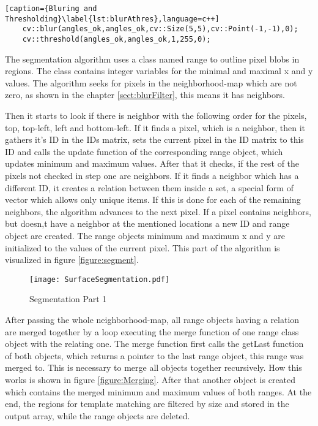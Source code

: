 \begin{lstlisting}[caption={Bluring and Thresholding}\label{lst:blurAthres},language=c++]
	cv::blur(angles_ok,angles_ok,cv::Size(5,5),cv::Point(-1,-1),0);
	cv::threshold(angles_ok,angles_ok,1,255,0);
\end{lstlisting}

The segmentation algorithm uses a class named range to outline pixel blobs in regions. The class contains integer 
variables for the minimal and maximal x and y values. The algorithm seeks for pixels in the 
neighborhood-map which are not zero, as shown in the chapter \vref{sect:blurFilter}, this means it has neighbors. 

Then it starts to look if there is neighbor with the following order for the pixels, top, top-left, left and bottom-left.
If it finds a pixel, which is a neighbor, then it gathers it's ID in the IDs matrix, sets the current pixel in the
ID matrix to this ID and calls the update function of the corresponding range object, which updates minimum and
maximum values. After that it checks, if the rest of the pixels not checked in step one are neighbors. 
If it finds a neighbor which has a different ID, it creates a relation between them inside a set, 
a special form of vector which allows only unique items. If this is done for each of the remaining neighbors, 
the algorithm advances to the next pixel. If a pixel contains neighbors, but doesn,t have a neighbor at the mentioned 
locations a new ID and range object are created. The range objects minimum and maximum x and y are initialized to the 
values of the current pixel. This part of the algorithm is visualized in figure \vref{figure:segment}.

\begin{figure}[H]
\begin{center}
  \texttt{[image: SurfaceSegmentation.pdf]}
  \caption{Segmentation Part 1}
  \label{figure:segment}
\end{center}
\end{figure}

After passing the whole neighborhood-map, all range objects having a relation are merged together
by a loop executing the merge function of one range class object with the relating one.
The merge function first calls the getLast function of both objects, which returns a pointer to the
last range object, this range was merged to. This is necessary to merge all objects together recursively.
How this works is shown in figure \vref{figure:Merging}. After that another object is created which 
contains the merged minimum and maximum values of both ranges. At the end, the regions for template matching
are filtered by size and stored in the output array, while the range objects are deleted. 

